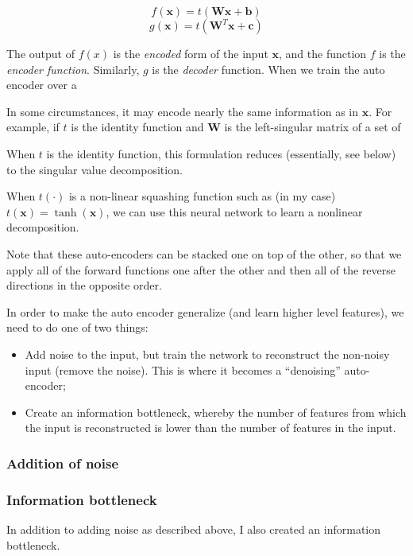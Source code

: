 \documentclass{article}
\begin{document}
$$
f(\mathbf{x}) = t(\mathbf{Wx} + \mathbf{b})
$$
$$
g(\mathbf{x}) = t(\mathbf{W}^T\mathbf{x} + \mathbf{c})
$$

The output of $f(x)$ is the \emph{encoded} form of the input $\mathbf{x}$, and the function $f$ is the \emph{encoder function}.  Similarly, $g$ is the \emph{decoder} function.  When we train the auto encoder over a 

In some circumstances, it may encode nearly the same information as in $\mathbf{x}$.  For example, if $t$ is the identity function and $\mathbf{W}$ is the left-singular matrix of a set of 

When $t$ is the identity function, this formulation reduces (essentially, see below) to the singular value decomposition.

When $t(\cdot)$ is a non-linear squashing function such as (in my case) $t(\mathbf{x}) = \tanh(\mathbf{x})$, we can use this neural network to learn a nonlinear decomposition.

Note that these auto-encoders can be stacked one on top of the other, so that we apply all of the forward functions one after the other and then all of the reverse directions in the opposite order.

In order to make the auto encoder generalize (and learn higher level features), we need to do one of two things:

\begin{itemize}
\item Add noise to the input, but train the network to reconstruct the non-noisy input (remove the noise).  This is where it becomes a ``denoising'' auto-encoder;
\item Create an information bottleneck, whereby the number of features from which the input is reconstructed is lower than the number of features in the input.
\end{itemize}

\subsubsection{Addition of noise}

\subsubsection{Information bottleneck}

In addition to adding noise as described above, I also created an information bottleneck.
\end{document}
